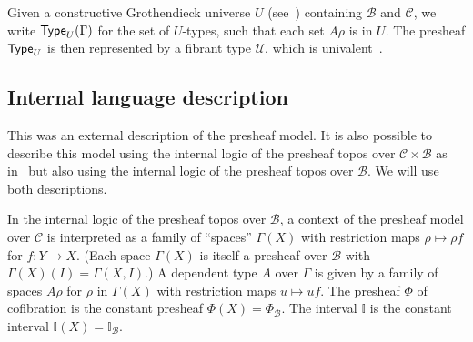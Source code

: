 \documentclass[10pt,a4paper,draft]{article}
\def\Type{\hbox{\sf Type}}
\newcommand{\II}{\mathbb{I}}
\newcommand{\UU}{\mathcal{U}}%
\newcommand{\CC}{{\mathcal C}}
\newcommand{\BB}{\mathcal{B}}
\newcommand{\pp}{{\sf p}}
\renewcommand{\~}{\widetilde}
\newcommand{\cofuniv}{\Phi}
\newcommand{\cofunivConst}{\Phi}
\theoremstyle{definition}
\theoremstyle{remark} %
\begin{document}

Given a constructive Grothendieck universe $U$ (see~\cite{Aczel98}) containing $\BB$ and $\CC$,
we write $\Type_{U}(\Gamma)$ for the set of $U$\hyp{}types, such that each set
$A\rho$ is in $U$. The presheaf $\Type_U$ is then represented by a fibrant
type $\UU$, which is univalent~\cite{CCHM15}.

\subsection{Internal language description}\label{subsec:internal-language-description}

This was an external description of the presheaf model.
It is also possible to describe this model
using
the internal logic of the presheaf topos over $\CC\times\BB$ as in~\cite{OrtonP16,CHM18}
but also using
the internal logic of the presheaf topos over $\BB$.
We will use both descriptions.

In the internal logic of the presheaf topos over $\BB$,
a context of the presheaf model over $\CC$ is interpreted as a family of ``spaces'' $\Gamma(X)$
with restriction maps $\rho\mapsto\rho f$ for $f:Y\rightarrow X$.
(Each space $\Gamma(X)$ is itself a presheaf over $\BB$ with $\Gamma(X)(I) = \Gamma(X,I)$.)
A dependent type $A$ over $\Gamma$ is given by a family of spaces $A\rho$
for $\rho$ in $\Gamma(X)$ with restriction maps $u\mapsto uf$. The presheaf
$\cofunivConst$ of cofibration is the constant presheaf $\cofunivConst(X) = \cofuniv_{\BB}$.
The interval $\II$ is the constant interval $\II(X) = \II_{\BB}$.
\end{document}
